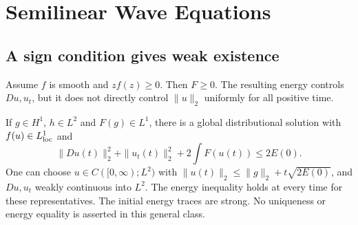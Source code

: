 \section{Semilinear Wave Equations}
\label{sec:12-3}
\subsection{A sign condition gives weak existence}
Assume $f$ is smooth and $zf(z)\ge0$. Then $F\ge0$.
The resulting energy controls $Du,u_t$, but it does not directly
control $\|u\|_2$ uniformly for all positive time.
\begin{theorem}
If $g\in H^1$, $h\in L^2$ and $F(g)\in L^1$, there is a global
distributional solution with $f(u)\in L^1_{\rm loc}$ and
\[
 \|Du(t)\|_2^2+\|u_t(t)\|_2^2+2\int F(u(t))\le2E(0).
\]
One can choose $u\in C([0,\infty);L^2)$ with
$\|u(t)\|_2\le\|g\|_2+t\sqrt{2E(0)}$, and $Du,u_t$ weakly
continuous into $L^2$. The energy inequality holds at every time
for these representatives. The initial energy traces are strong.
No uniqueness or energy equality is asserted in this general class.
\end{theorem}
